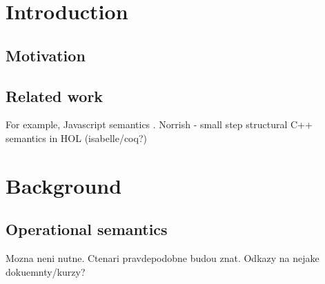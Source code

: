 \documentclass{fithesis3}
\begin{document}
\chapter{Introduction}



\section{Motivation}

\section{Related work}
For example, Javascript semantics \cite{park-stefanescu-rosu-2015-pldi}.
Norrish - small step structural C++ semantics in HOL (isabelle/coq?)


\chapter{Background}

\section{Operational semantics}
Mozna neni nutne. Ctenari pravdepodobne budou znat. Odkazy na nejake dokuemnty/kurzy?
\end{document}
